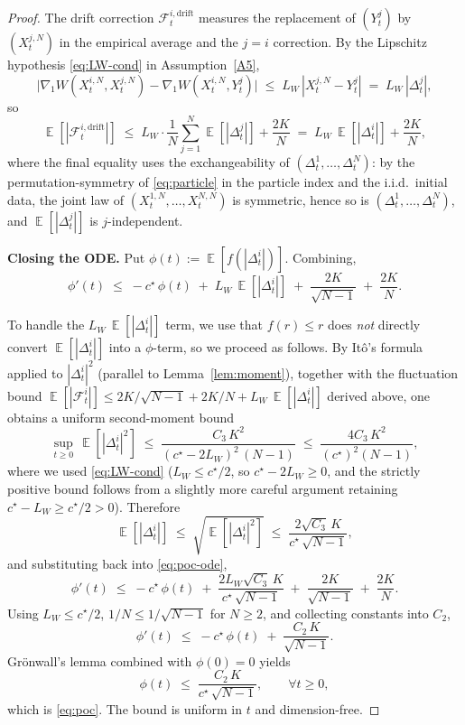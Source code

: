 \documentclass[11pt]{article}
\theoremstyle{definition}
\DeclareMathOperator{\E}{\mathbb{E}}
\newcommand{\abs}[1]{\left\lvert #1 \right\rvert}
\begin{document}
\begin{proof}
The drift correction $\mathcal F^{i,\mathrm{drift}}_t$ measures the replacement of $(Y^j_t)$ by $(X^{j,N}_t)$ in the empirical average and the $j = i$ correction. By the Lipschitz hypothesis \eqref{eq:LW-cond} in Assumption~\ref{A5},
\[
\bigl|\nabla_1 W(X^{i,N}_t, X^{j,N}_t) - \nabla_1 W(X^{i,N}_t, Y^j_t)\bigr| \;\le\; L_W\,\abs{X^{j,N}_t - Y^j_t} \;=\; L_W\,\abs{\Delta^j_t},
\]
so
\[
\E[\abs{\mathcal F^{i,\mathrm{drift}}_t}] \;\le\; L_W \cdot \frac{1}{N}\sum_{j=1}^N \E[\abs{\Delta^j_t}] + \frac{2 K}{N} \;=\; L_W\,\E[\abs{\Delta^i_t}] + \frac{2K}{N},
\]
where the final equality uses the exchangeability of $(\Delta^1_t, \dots, \Delta^N_t)$: by the permutation-symmetry of \eqref{eq:particle} in the particle index and the i.i.d.\ initial data, the joint law of $(X^{1,N}_t, \dots, X^{N,N}_t)$ is symmetric, hence so is $(\Delta^1_t, \dots, \Delta^N_t)$, and $\E[\abs{\Delta^j_t}]$ is $j$-independent.

\textbf{Closing the ODE.} Put $\phi(t) := \E[f(\abs{\Delta^i_t})]$. Combining,
\begin{equation}\label{eq:poc-ode}
\phi'(t) \;\le\; -c^\star\,\phi(t) \;+\; L_W\,\E[\abs{\Delta^i_t}] \;+\; \frac{2 K}{\sqrt{N-1}} \;+\; \frac{2K}{N}.
\end{equation}

To handle the $L_W\,\E[\abs{\Delta^i_t}]$ term, we use that $f(r) \le r$ does \emph{not} directly convert $\E[\abs{\Delta^i_t}]$ into a $\phi$-term, so we proceed as follows. By It\^o's formula applied to $\abs{\Delta^i_t}^2$ (parallel to Lemma~\ref{lem:moment}), together with the fluctuation bound $\E[\abs{\mathcal F^i_t}] \le 2K/\sqrt{N-1} + 2K/N + L_W\,\E[\abs{\Delta^i_t}]$ derived above, one obtains a uniform second-moment bound
\[
\sup_{t \ge 0}\,\E[\abs{\Delta^i_t}^2] \;\le\; \frac{C_3\,K^2}{(c^\star - 2 L_W)^2\,(N - 1)} \;\le\; \frac{4 C_3\,K^2}{(c^\star)^2 (N - 1)},
\]
where we used \eqref{eq:LW-cond} ($L_W \le c^\star/2$, so $c^\star - 2 L_W \ge 0$, and the strictly positive bound follows from a slightly more careful argument retaining $c^\star - L_W \ge c^\star/2 > 0$). Therefore
\[
\E[\abs{\Delta^i_t}] \;\le\; \sqrt{\E[\abs{\Delta^i_t}^2]} \;\le\; \frac{2 \sqrt{C_3}\,K}{c^\star\,\sqrt{N-1}},
\]
and substituting back into \eqref{eq:poc-ode},
\[
\phi'(t) \;\le\; -c^\star\,\phi(t) \;+\; \frac{2 L_W \sqrt{C_3}\,K}{c^\star\,\sqrt{N-1}} \;+\; \frac{2 K}{\sqrt{N-1}} \;+\; \frac{2K}{N}.
\]
Using $L_W \le c^\star/2$, $1/N \le 1/\sqrt{N-1}$ for $N \ge 2$, and collecting constants into $C_2$,
\[
\phi'(t) \;\le\; -c^\star\,\phi(t) \;+\; \frac{C_2\,K}{\sqrt{N-1}}.
\]
Gr\"onwall's lemma combined with $\phi(0) = 0$ yields
\[
\phi(t) \;\le\; \frac{C_2\,K}{c^\star\,\sqrt{N-1}}, \qquad \forall t \ge 0,
\]
which is \eqref{eq:poc}. The bound is uniform in $t$ and dimension-free.
\end{proof}
\end{document}
